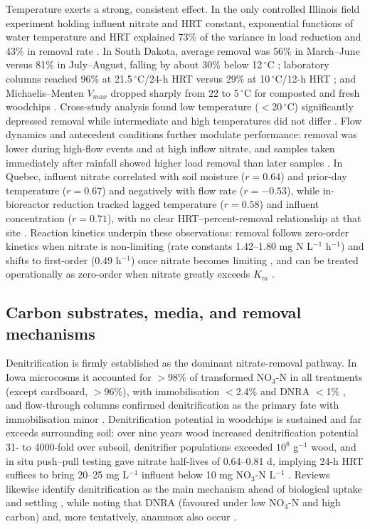 Temperature exerts a strong, consistent effect. In the only controlled Illinois field experiment holding influent nitrate and HRT constant, exponential functions of water temperature and HRT explained 73\% of the variance in load reduction and 43\% in removal rate \parencite{Bell2015}. In South Dakota, average removal was 56\% in March--June versus 81\% in July--August, falling by about 30\% below 12\,$^{\circ}$C \parencite{Thapa2023}; laboratory columns reached 96\% at 21.5\,$^{\circ}$C/24-h HRT versus 29\% at 10\,$^{\circ}$C/12-h HRT \parencite{Soupir2018}; and Michaelis--Menten $V_{max}$ dropped sharply from 22 to 5\,$^{\circ}$C for composted and fresh woodchips \parencite{Kouanda2021}. Cross-study analysis found low temperature ($<$20\,$^{\circ}$C) significantly depressed removal while intermediate and high temperatures did not differ \parencite{Zhang2021b}. Flow dynamics and antecedent conditions further modulate performance: removal was lower during high-flow events and at high inflow nitrate, and samples taken immediately after rainfall showed higher load removal than later samples \parencite{Thapa2023}. In Quebec, influent nitrate correlated with soil moisture ($r=0.64$) and prior-day temperature ($r=0.67$) and negatively with flow rate ($r=-0.53$), while in-bioreactor reduction tracked lagged temperature ($r=0.58$) and influent concentration ($r=0.71$), with no clear HRT--percent-removal relationship at that site \parencite{Husk2017}. Reaction kinetics underpin these observations: removal follows zero-order kinetics when nitrate is non-limiting (rate constants 1.42--1.80 mg N L$^{-1}$ h$^{-1}$) and shifts to first-order ($0.49$ h$^{-1}$) once nitrate becomes limiting \parencite{Hua2016}, and can be treated operationally as zero-order when nitrate greatly exceeds $K_m$ \parencite{Kouanda2021}.

\subsection{Carbon substrates, media, and removal mechanisms}

Denitrification is firmly established as the dominant nitrate-removal pathway. In Iowa microcosms it accounted for $>$98\% of transformed NO$_3$-N in all treatments (except cardboard, $>$96\%), with immobilisation $<$2.4\% and DNRA $<$1\% \parencite{Greenan2006}, and flow-through columns confirmed denitrification as the primary fate with immobilisation minor \parencite{Greenan2009}. Denitrification potential in woodchips is sustained and far exceeds surrounding soil: over nine years wood increased denitrification potential 31- to 4000-fold over subsoil, denitrifier populations exceeded $10^8$ g$^{-1}$ wood, and in situ push--pull testing gave nitrate half-lives of 0.64--0.81 d, implying 24-h HRT suffices to bring 20--25 mg L$^{-1}$ influent below 10 mg NO$_3$-N L$^{-1}$ \parencite{Moorman2010}. Reviews likewise identify denitrification as the main mechanism ahead of biological uptake and settling \parencite{Mendes2021}, while noting that DNRA (favoured under low NO$_3$-N and high carbon) and, more tentatively, anammox also occur \parencite{Hartfiel2022}.

